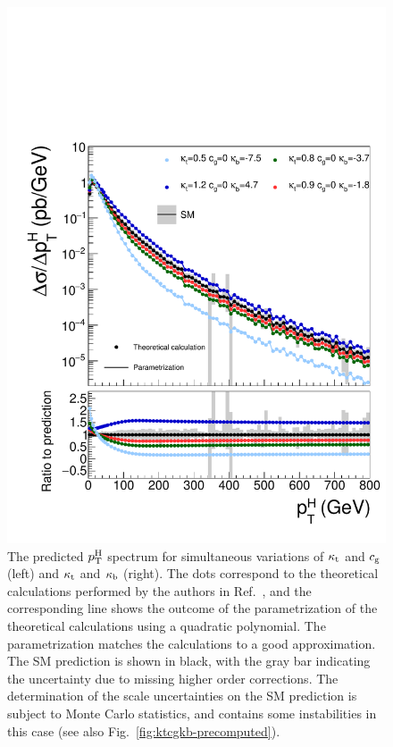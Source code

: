 \begin{figure}[hbtp]
\begin{center}
    \includegraphics[width=\halflinewidth]{img/interpretation/other/varparcomp_ktkb.pdf}
    \caption{
        The predicted $p_\mathrm{T}^\mathrm{H}$ spectrum for simultaneous variations of $\kappa_{\mathrm{t}}$ and $c_\mathrm{g}$ (left) and $\kappa_{\mathrm{t}}$ and $\kappa_{\mathrm{b}}$ (right).
        The dots correspond to the theoretical calculations performed by the authors in Ref.~\cite{Grazzini:2017szg}, and the corresponding line shows the outcome of the parametrization of the theoretical calculations using a quadratic polynomial.
        The parametrization matches the calculations to a good approximation.
        The SM prediction is shown in black, with the gray bar indicating the uncertainty due to missing higher order corrections.
        The determination of the scale uncertainties on the SM prediction is subject to Monte Carlo statistics, and contains some instabilities in this case (see also Fig.~\ref{fig:ktcgkb-precomputed}).
        }
    \label{fig:theories_ktcgkb}
  \end{center}
\end{figure}


